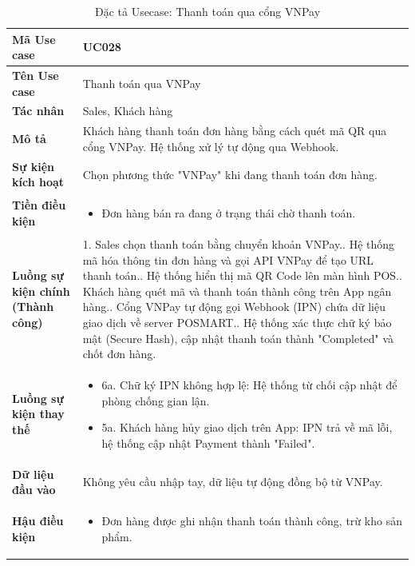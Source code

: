 \documentclass[12pt,a4paper]{report}
\begin{document}
\begin{longtable}{|>{\raggedright\arraybackslash\bfseries}p{4.5cm}|p{11cm}|}
\caption{Đặc tả Usecase: Thanh toán qua cổng VNPay} \label{tab:uc_028} \\
\hline
Mã Use case & UC028 \\ \hline
Tên Use case & Thanh toán qua VNPay \\ \hline
Tác nhân & Sales, Khách hàng \\ \hline
Mô tả & Khách hàng thanh toán đơn hàng bằng cách quét mã QR qua cổng VNPay. Hệ thống xử lý tự động qua Webhook. \\ \hline
Sự kiện kích hoạt & Chọn phương thức "VNPay" khi đang thanh toán đơn hàng. \\ \hline
Tiền điều kiện & 
\begin{itemize}[leftmargin=*, nosep, topsep=0pt, partopsep=0pt]
    \item Đơn hàng bán ra đang ở trạng thái chờ thanh toán.
\end{itemize} \\ \hline
Luồng sự kiện chính (Thành công) & 
1. Sales chọn thanh toán bằng chuyển khoản VNPay.\newline
2. Hệ thống mã hóa thông tin đơn hàng và gọi API VNPay để tạo URL thanh toán.\newline
3. Hệ thống hiển thị mã QR Code lên màn hình POS.\newline
4. Khách hàng quét mã và thanh toán thành công trên App ngân hàng.\newline
5. Cổng VNPay tự động gọi Webhook (IPN) chứa dữ liệu giao dịch về server POSMART.\newline
6. Hệ thống xác thực chữ ký bảo mật (Secure Hash), cập nhật thanh toán thành "Completed" và chốt đơn hàng. \\ \hline
Luồng sự kiện thay thế & 
\begin{itemize}[leftmargin=*, nosep, topsep=0pt, partopsep=0pt]
    \item 6a. Chữ ký IPN không hợp lệ: Hệ thống từ chối cập nhật để phòng chống gian lận.
    \item 5a. Khách hàng hủy giao dịch trên App: IPN trả về mã lỗi, hệ thống cập nhật Payment thành "Failed".
\end{itemize} \\ \hline
Dữ liệu đầu vào & Không yêu cầu nhập tay, dữ liệu tự động đồng bộ từ VNPay. \\ \hline
Hậu điều kiện & 
\begin{itemize}[leftmargin=*, nosep, topsep=0pt, partopsep=0pt]
    \item Đơn hàng được ghi nhận thanh toán thành công, trừ kho sản phẩm.
\end{itemize} \\ \hline
\end{longtable}
\end{document}
